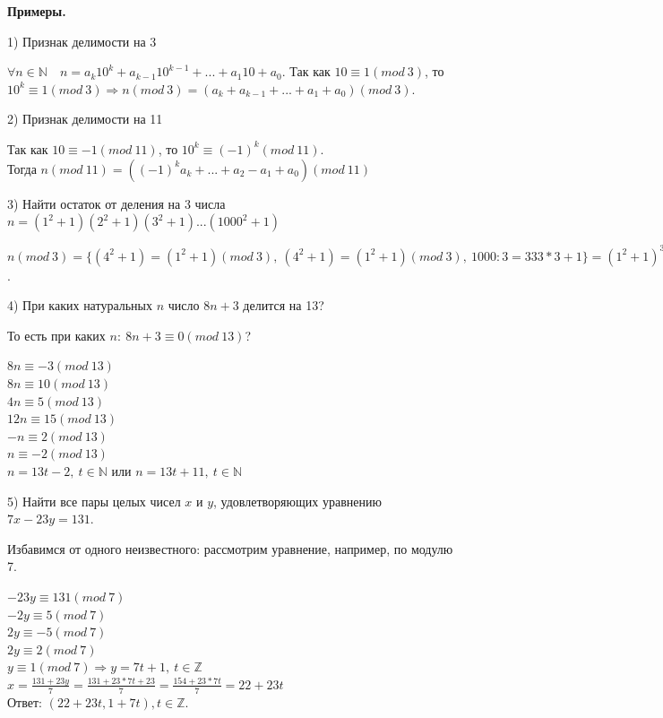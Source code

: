 \documentclass{article}
\begin{document}
            \textbf{Примеры.}

            1) Признак делимости на 3

            \( \forall n \in \mathbb{N}\quad n = a_k10^k + a_{k - 1}10^{k - 1} + ... + a_1 10 + a_0 \). Так как \(10 \equiv 1 (mod\ 3)\), то \(10^k \equiv 1 (mod\ 3) \Rightarrow n(mod\ 3) = (a_k + a_{k - 1} + ... + a_1 + a_0)(mod\ 3)\).

            2) Признак делимости на 11

            Так как \( 10 \equiv -1 (mod\ 11) \), то \( 10^k \equiv (-1)^k(mod\ 11) \).\\
            Тогда \( n(mod\ 11) = ((-1)^ka_k + ... + a_2 - a_1 + a_0)(mod\ 11) \)

            3) Найти остаток от деления на 3 числа \( n = (1^2 + 1)(2^2 + 1)(3^2 + 1)...(1000^2 + 1) \)

            \( n(mod\ 3) = \{(4^2 + 1) = (1^2 + 1)(mod\ 3),\ (4^2 + 1) = (1^2 + 1)(mod\ 3),\ 1000:3 = 333*3 + 1 \} = (1^2 + 1)^{334}(2^2 + 1)^{333}(3^2 + 1)^{333}(mod\ 3) \equiv (2)^{334}(2)^{333}(1)^{333}(mod\ 3) \equiv (2)^{667}(mod\ 3) \equiv (-1)^{667}(mod\ 3) \equiv -1(mod\ 3) \equiv 2(mod\ 3) \).

            4) При каких натуральных \(n\) число \(8n + 3\) делится на 13?

            То есть при каких \(n:\ 8n + 3 \equiv 0(mod\ 13)\)?

            \( 8n \equiv -3(mod\ 13) \)\\
            \( 8n \equiv 10(mod\ 13) \)\\
            \( 4n \equiv 5(mod\ 13) \)\\
            \( 12n \equiv 15(mod\ 13) \)\\
            \( -n \equiv 2(mod\ 13) \)\\
            \( n \equiv -2(mod\ 13) \)\\
            \( n = 13t - 2,\ t \in \mathbb{N} \) или \( n = 13t + 11,\ t \in \mathbb{N} \)

            5) Найти все пары целых чисел \(x\) и \(y\), удовлетворяющих уравнению \(7x - 23y = 131\).

            Избавимся от одного неизвестного: рассмотрим уравнение, например, по модулю 7.

            \( -23y \equiv 131(mod\ 7) \)\\
            \( -2y \equiv 5(mod\ 7) \)\\
            \( 2y \equiv -5(mod\ 7) \)\\
            \( 2y \equiv 2(mod\ 7) \)\\
            \( y \equiv 1(mod\ 7) \Rightarrow y = 7t + 1,\ t \in \mathbb{Z} \)\\
            \( x = \frac{131 + 23y}{7} = \frac{131 + 23*7t + 23}{7} = \frac{154 + 23*7t}{7} = 22 + 23t \)\\
            Ответ: \( (22 + 23t, 1 + 7t), t \in \mathbb{Z} \).
          
\end{document}
